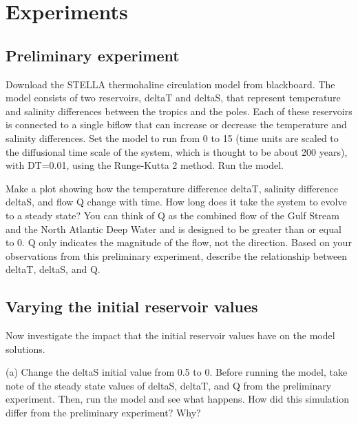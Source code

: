 \documentclass[11pt,letterpaper]{article}
\begin{document}
\section{Experiments}
\subsection{Preliminary experiment}
Download the STELLA thermohaline circulation model from blackboard. The model consists of two reservoirs, deltaT and deltaS, that represent temperature and salinity differences between the tropics and the poles. Each of these reservoirs is connected to a single biflow that can increase or decrease the temperature and salinity differences. Set the model to run from 0 to 15 (time units are scaled to the diffusional time scale of the system, which is thought to be about 200 years), with DT=0.01, using the Runge‐Kutta 2 method. Run the model.

Make a plot showing how the temperature difference deltaT, salinity difference deltaS, and flow Q change with time. How long does it take the system to evolve to a steady state? You can think of Q as the combined flow of the Gulf Stream and the North Atlantic Deep Water and is designed to be greater than or equal to 0. Q only indicates the magnitude of the flow, not the direction. Based on your observations from this preliminary experiment, describe the relationship between deltaT, deltaS, and Q.


\subsection{Varying the initial reservoir values}
Now investigate the impact that the initial reservoir values have on the model solutions.

(a) Change the deltaS initial value from 0.5 to 0. Before running the model, take note of the steady state values of deltaS, deltaT, and Q from the preliminary experiment. Then, run the model and see what happens. How did this simulation differ from the preliminary experiment? Why?
\end{document}
